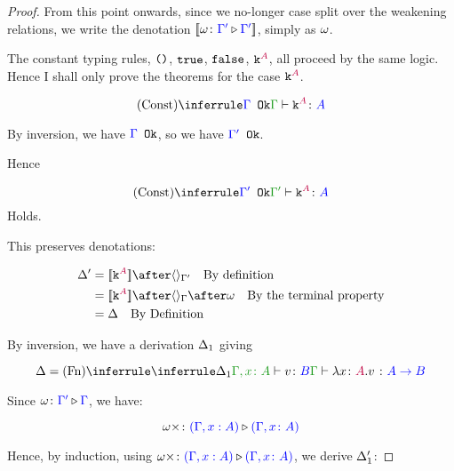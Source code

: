 \documentclass{report}
\begin{document}
\begin{framed}
\begin{proof}
        From this point onwards, since we no-longer case split over the weakening relations, we write the denotation ${\bf [\![}\omega \colon {\color{blue}\Gamma'} \triangleright {\color {blue} \Gamma'}{\bf ]\!]}$, simply as $\omega$.
        
        
        \case{\vconst}
        The constant typing rules, $\texttt{()}$, $\texttt{true}$, $\texttt{false}$, $\texttt{k}^{\color{purple} A}$, all proceed by the same logic. Hence I shall only prove the theorems for the case $\texttt{k}^{\color{purple} A}$.
        
        \begin{equation}
            \truleconst
        \end{equation}
        
        By inversion, we have ${\color{blue} \Gamma} \texttt{ Ok}$, so we have ${\color{blue} \Gamma'} \texttt{ Ok}$.
        
        Hence
        
        \begin{equation}
            \ntreeruleI{\vconst}{\ok{\G'}}{\typerelation{\G'}{\const{A}}{A}}
        \end{equation}
        Holds.
        
        This preserves denotations:
        
        
        \begin{align*}
            \D' & = \deno{\const{A}} \after \term{\G'}\qt{By definition}\\
            & = \deno{\const{A}} \after \term{\G}\after \w \qt{By the terminal property}\\
            & = \D\qt{By Definition}\\
        \end{align*}
        
        
        \case{\vfun}
        By inversion, we have a derivation $\Delta_1$ giving
        
        \begin{equation}
            \D = \ntreeruleI{\vfun}{
                \treeruleI{\D_1}{\typerelation{\gax}{v}{B}}
            }{\gtyperelation{\lam{x}{A}{v}}{\ab}}
        \end{equation}
        
        Since $\omega \colon {\color{blue}\Gamma'} \triangleright {\color {blue} \Gamma}$, we have:
        
        \begin{equation}
            \omega\times \colon {\color{blue}(\Gamma,x:  A)} \triangleright {\color {blue} (\Gamma, x\colon A)}
        \end{equation}
        
        Hence, by induction, using $\omega\times \colon {\color{blue}(\Gamma,x:  A)} \triangleright {\color {blue} (\Gamma, x\colon A)}$, we derive $\Delta_1'$:
        

\end{proof}
\end{framed}
\end{document}
